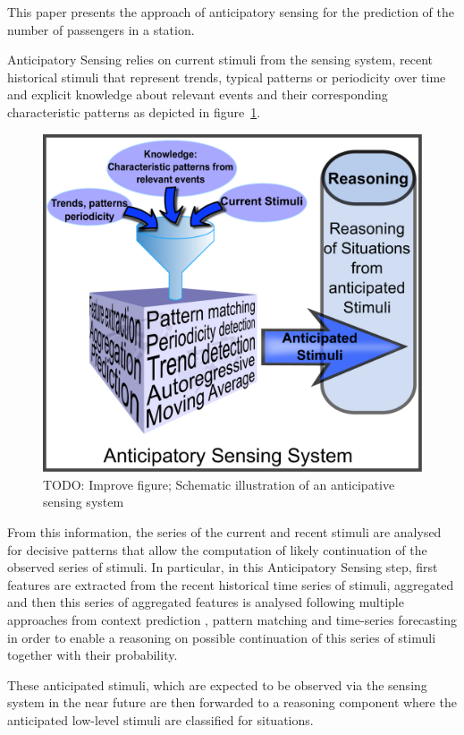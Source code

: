 This paper presents the approach of anticipatory sensing for the prediction of the number of passengers in a station.

Anticipatory Sensing relies on current stimuli from the sensing system, recent historical stimuli that represent trends, typical patterns or periodicity over time and explicit knowledge about relevant events and their corresponding characteristic patterns as depicted in figure~\ref{figureAnticipativeSensingSystem}.
\begin{figure}
 \includegraphics[width=\columnwidth]{Figures/AnticipativeSensingSystem2.pdf}
 \caption{TODO: Improve figure; Schematic illustration of an anticipative sensing system}
 \label{figureAnticipativeSensingSystem}
\end{figure}

From this information, the series of the current and recent stimuli are analysed for decisive patterns that allow the computation of likely continuation of the observed series of stimuli.
In particular, in this Anticipatory Sensing step, first features are extracted from the recent historical time series of stimuli, aggregated and then this series of aggregated features is analysed following multiple approaches from context prediction , pattern matching and time-series forecasting in order to enable a reasoning on possible continuation of this series of stimuli together with their probability.

These anticipated stimuli, which are expected to be observed via the sensing system in the near future are then forwarded to a reasoning component where the anticipated low-level stimuli are classified for situations.

